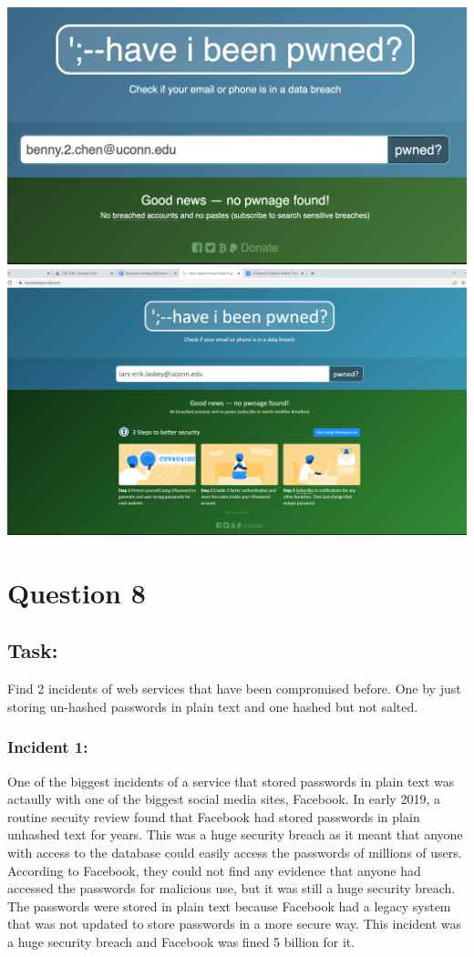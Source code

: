 \documentclass{article}
\begin{document}
\begin{center}
    \includegraphics[scale=.5]{images/account_check.png}
    \includegraphics[scale=.245]{images/account_check2.png}
\end{center}

\section{Question 8}
\subsection*{Task:}
Find 2 incidents of web services that have been compromised before.
One by just storing un-hashed passwords in plain text and one hashed but not salted.

\subsubsection*{Incident 1:}
One of the biggest incidents of a service that stored passwords in plain text was actaully
with one of the biggest social media sites, Facebook. In early 2019, a routine secuity review
found that Facebook had stored passwords in plain unhashed text for years. This was a huge
security breach as it meant that anyone with access to the database could easily access the
passwords of millions of users. According to Facebook, they could not find any evidence that
anyone had accessed the passwords for malicious use, but it was still a huge security breach. The passwords were
stored in plain text because Facebook had a legacy system that was not updated to store passwords
in a more secure way. This incident was a huge security breach and Facebook was fined 5 billion
for it.
\end{document}
